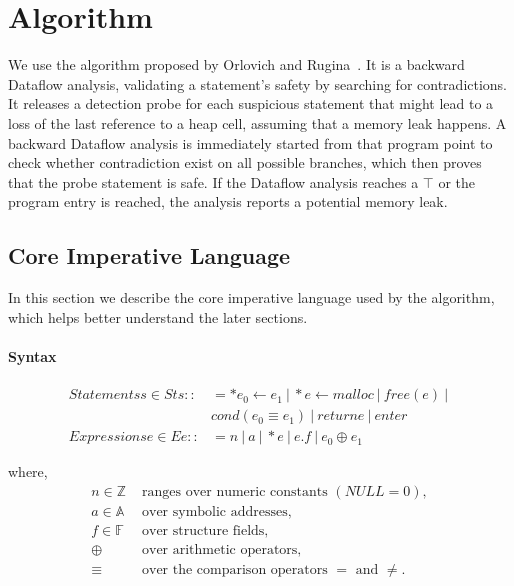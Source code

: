 \section{Algorithm}
\label{s:algorithm}

We use the algorithm proposed by Orlovich and Rugina~\cite{rugina}. It is a 
backward Dataflow analysis, validating a statement's safety by searching for 
contradictions. It releases a detection probe for each suspicious statement 
that might lead to a loss of the last reference to a heap cell, assuming that 
a memory leak happens. A backward Dataflow analysis is immediately started from
that program point to check whether contradiction exist on all possible 
branches, which then proves that the probe statement is safe. If the Dataflow analysis 
reaches a $\top$ or the program entry is reached, the analysis reports a 
potential memory leak.


\subsection{Core Imperative Language}
\label{ss:semantics}

In this section we describe the core imperative language 
used by the algorithm, which helps better understand the later sections.

\paragraph{Syntax} 
\begin{align*}
  Statements s\in St s:: &= *e_0\gets e_1\ |\ *e\gets malloc\ |\ free(e)\ |\ \\
                         &     cond(e_0\equiv e_1)\ |\ return e\ |\ enter \\
  Expressions e\in E e:: &= n\ |\ a\ |\ *e\ |\ e.f\ |\ e_0 \oplus e_1 
\end{align*}

where, 
\begin{align*}
  n\in \mathbb{Z} &\text{  ranges over numeric constants $(NULL=0)$}, \\
  a\in \mathbb{A} &\text{  over symbolic addresses,} \\
  f\in \mathbb{F} &\text{  over structure fields,} \\
           \oplus &\text{  over arithmetic operators,} \\
           \equiv &\text{  over the comparison operators $=$ and $\ne$.}
\end{align*}


